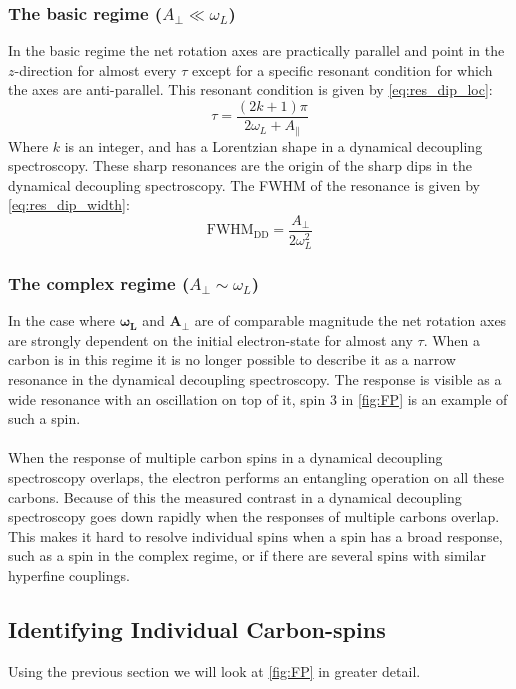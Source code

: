 \subsubsection{The basic regime ($A_\perp \ll \omega_L$)}
In the basic regime the net rotation axes are practically parallel and point in the $z$-direction for almost every $\tau$ except for a specific resonant condition for which the axes are anti-parallel.
This resonant condition is given by \cref{eq:res_dip_loc}:
 \begin{equation}
\tau = \frac{(2k+1)\pi}{2 \omega_L + A_\parallel}
\label{eq:res_dip_loc}
\end{equation}
Where $k$ is an integer, and has a Lorentzian shape in a dynamical decoupling spectroscopy.
These sharp resonances are the origin of the sharp dips in the dynamical decoupling spectroscopy.
The FWHM of the resonance is given by \cref{eq:res_dip_width}:
 \begin{equation}
\mathrm{FWHM_{DD}} = \frac{A_\perp}{2 \omega_L^2}
\label{eq:res_dip_width}
\end{equation}


\subsubsection{The complex regime ($A_\perp \sim \omega_L$)}

In the case where $\bm{\omega_L}$ and $\bm{A_\perp}$ are of comparable magnitude the net rotation axes are strongly dependent on the initial electron-state for almost any $\tau$.
When a carbon is in this regime it is no longer possible to describe it as a narrow resonance in the dynamical decoupling spectroscopy.
The response is visible as a wide resonance with an oscillation on top of it, spin 3 in \cref{fig:FP} is an example of such a spin.

\paragraph{ }
When the response of multiple carbon spins in a dynamical decoupling spectroscopy overlaps, the electron performs an entangling operation on all these carbons.
Because of this the measured contrast in a dynamical decoupling spectroscopy goes down rapidly when the responses of multiple carbons overlap.
This makes it hard to resolve individual spins when a spin has a broad response, such as a spin in the complex regime, or if there are several spins with similar hyperfine couplings.


\subsection{Identifying Individual Carbon-spins}
Using the previous section we will look at \cref{fig:FP} in greater detail.


